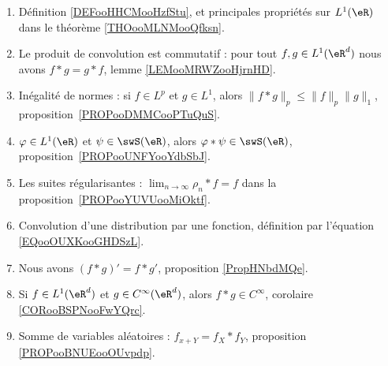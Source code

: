 	\label{THEMEooConvolution}
\begin{enumerate}
	\item
	      Définition \ref{DEFooHHCMooHzfStu}, et principales propriétés sur \( L^1(\eR)\) dans le théorème \ref{THOooMLNMooQfksn}.
	\item
	      Le produit de convolution est commutatif : pour tout \( f,g\in L^1(\eR^d)\) nous avons \( f*g=g*f\), lemme \ref{LEMooMRWZooHjrnHD}.
	\item
	      Inégalité de normes : si \( f\in L^p\) et \( g\in L^1\), alors \( \| f*g \|_p\leq \| f \|_p\| g \|_1\), proposition~\ref{PROPooDMMCooPTuQuS}.
	\item
	      \( \varphi\in L^1(\eR)\) et \( \psi\in\swS(\eR)\), alors \( \varphi * \psi\in \swS(\eR)\), proposition~\ref{PROPooUNFYooYdbSbJ}.
	\item
	      Les suites régularisantes : \( \lim_{n\to \infty} \rho_n*f=f\) dans la proposition~\ref{PROPooYUVUooMiOktf}.
	\item
	      Convolution d'une distribution par une fonction, définition par l'équation \eqref{EQooOUXKooGHDSzL}.
	\item
	      Nous avons \( (f*g)'=f*g'\), proposition \ref{PropHNbdMQe}.
	\item
	      Si \( f\in L^1(\eR^d)\) et \( g\in C^{\infty}(\eR^d)\), alors \( f*g\in C^{\infty}\), corolaire \ref{CORooBSPNooFwYQrc}.
	\item
	      Somme de variables aléatoires : \( f_{x+Y}=f_X*f_Y\), proposition \ref{PROPooBNUEooOUvpdp}.
\end{enumerate}
